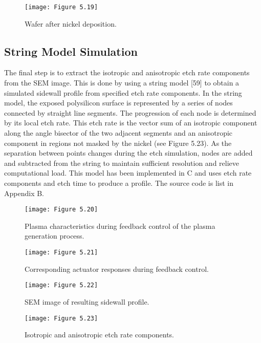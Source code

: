 \begin{figure}[H]
	\centering	
	\texttt{[image: Figure 5.19]}
	\bf\caption{ Wafer after nickel deposition.}
	\label{fig:5.19}
\end{figure}

\subsection{String Model Simulation}
\tab The final step is to extract the isotropic and anisotropic etch rate components from the
SEM image. This is done by using a string model [59] to obtain a simulated sidewall profile
from specified etch rate components. In the string model, the exposed polysilicon surface
is represented by a series of nodes connected by straight line segments. The progression
of each node is determined by its local etch rate. This etch rate is the vector sum of an
isotropic component along the angle bisector of the two adjacent segments and an anisotropic
component in regions not masked by the nickel (see Figure 5.23). As the separation between
points changes during the etch simulation, nodes are added and subtracted from the string
to maintain sufficient resolution and relieve computational load. This model has been
implemented in C and uses etch rate components and etch time to produce a profile. The
source code is list in Appendix B.

\begin{figure}[H]
	\centering	
	\texttt{[image: Figure 5.20]}
	\bf\caption{ Plasma characteristics during feedback control of the plasma generation process.}
	\label{fig:5.20}
\end{figure}

\begin{figure}[H]
	\centering	
	\texttt{[image: Figure 5.21]}
	\bf\caption{ Corresponding actuator responses during feedback control.}
	\label{fig:5.21}
\end{figure}

\begin{figure}[H]
	\centering	
	\texttt{[image: Figure 5.22]}
	\bf\caption{ SEM image of resulting sidewall profile.}
	\label{fig:5.22}
\end{figure}

\begin{figure}[H]
	\centering	
	\texttt{[image: Figure 5.23]}
	\bf\caption{ Isotropic and anisotropic etch rate components.}
	\label{fig:5.23}
\end{figure}

